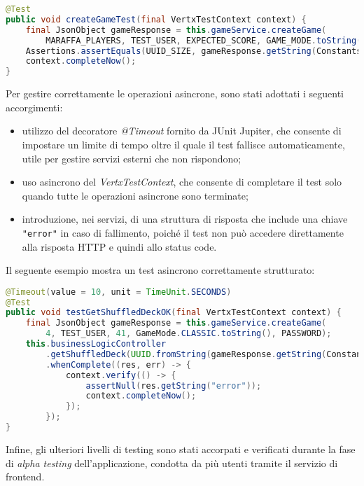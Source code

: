 \begin{lstlisting}[language=Java, caption={Esempio di test standard con Vert.x}, label=list:test_std_vertx]
@Test
public void createGameTest(final VertxTestContext context) {
    final JsonObject gameResponse = this.gameService.createGame(
        MARAFFA_PLAYERS, TEST_USER, EXPECTED_SCORE, GAME_MODE.toString(), PASSWORD);
    Assertions.assertEquals(UUID_SIZE, gameResponse.getString(Constants.GAME_ID).length());
    context.completeNow();
}
\end{lstlisting}

Per gestire correttamente le operazioni asincrone, sono stati adottati i seguenti accorgimenti:
\begin{itemize}
    \item utilizzo del decoratore \textit{@Timeout} fornito da JUnit Jupiter, che consente di impostare un limite di tempo oltre il quale il test fallisce automaticamente, utile per gestire servizi esterni che non rispondono;
    \item uso asincrono del \textit{VertxTestContext}, che consente di completare il test solo quando tutte le operazioni asincrone sono terminate;
    \item introduzione, nei servizi, di una struttura di risposta che include una chiave \texttt{"error"} in caso di fallimento, poiché il test non può accedere direttamente alla risposta HTTP e quindi allo status code.
\end{itemize}

Il seguente esempio mostra un test asincrono correttamente strutturato:

\begin{lstlisting}[language=Java, caption={Esempio di test asincrono con Vert.x}, label=list:test_async_vertx]
@Timeout(value = 10, unit = TimeUnit.SECONDS)
@Test
public void testGetShuffledDeckOK(final VertxTestContext context) {
    final JsonObject gameResponse = this.gameService.createGame(
        4, TEST_USER, 41, GameMode.CLASSIC.toString(), PASSWORD);
    this.businessLogicController
        .getShuffledDeck(UUID.fromString(gameResponse.getString(Constants.GAME_ID)), 4)
        .whenComplete((res, err) -> {
            context.verify(() -> {
                assertNull(res.getString("error"));
                context.completeNow();
            });
        });
}
\end{lstlisting}

Infine, gli ulteriori livelli di testing sono stati accorpati e verificati durante la fase di \textit{alpha testing} dell’applicazione, condotta da più utenti tramite il servizio di frontend.
